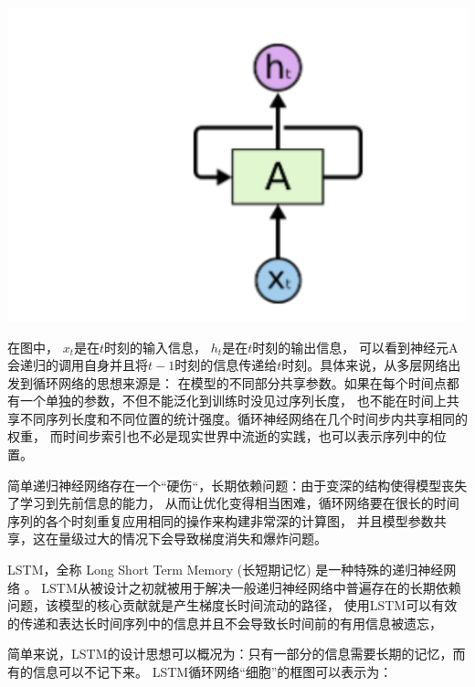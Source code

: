 \documentclass[11pt]{article}
\begin{document}
            \begin{center}
                \includegraphics[scale = 0.7]{graph/lstm1.png}
            \end{center}

            在图中， $x_t$是在$t$时刻的输入信息， $h_t$是在$t$时刻的输出信息，
            可以看到神经元A会递归的调用自身并且将$t-1$时刻的信息传递给$t$时刻。具体来说，从多层网络出发到循环网络的思想来源是：
            在模型的不同部分共享参数。如果在每个时间点都有一个单独的参数，不但不能泛化到训练时没见过序列长度，
            也不能在时间上共享不同序列长度和不同位置的统计强度。循环神经网络在几个时间步内共享相同的权重，
            而时间步索引也不必是现实世界中流逝的实践，也可以表示序列中的位置。
            
            简单递归神经网络存在一个“硬伤“，长期依赖问题：由于变深的结构使得模型丧失了学习到先前信息的能力，
            从而让优化变得相当困难，循环网络要在很长的时间序列的各个时刻重复应用相同的操作来构建非常深的计算图，
            并且模型参数共享，这在量级过大的情况下会导致梯度消失和爆炸问题。
            
            LSTM，全称 Long Short Term Memory (长短期记忆) 是一种特殊的递归神经网络 。
            LSTM从被设计之初就被用于解决一般递归神经网络中普遍存在的长期依赖问题，该模型的核心贡献就是产生梯度长时间流动的路径，
            使用LSTM可以有效的传递和表达长时间序列中的信息并且不会导致长时间前的有用信息被遗忘，
            
            简单来说，LSTM的设计思想可以概况为：只有一部分的信息需要长期的记忆，而有的信息可以不记下来。
            LSTM循环网络“细胞”的框图可以表示为：
\end{document}
